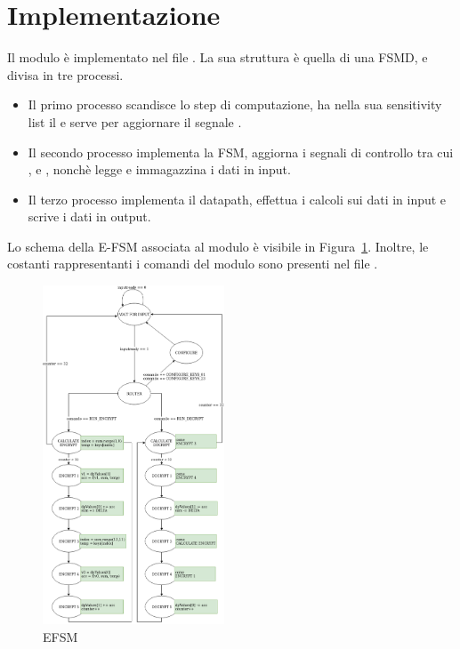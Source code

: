 \section{Implementazione}

Il modulo è implementato nel file . La sua struttura è quella di una FSMD, e divisa in tre processi.
\begin{itemize}
    \item Il primo processo scandisce lo step di computazione, ha nella sua sensitivity list il  e serve per aggiornare il segnale . 
    \item Il secondo processo implementa la FSM, aggiorna i segnali di controllo tra cui ,  e , nonchè legge e immagazzina i dati in input. 
    \item Il terzo processo implementa il datapath, effettua i calcoli sui dati in input e scrive i dati in output. 
\end{itemize} 
Lo schema della E-FSM associata al modulo è visibile in Figura~\ref{fig:efsm}. Inoltre, le costanti rappresentanti i comandi del modulo sono presenti nel file .

\begin{figure}
    \centering
    \includegraphics[width=0.48\textwidth]{vhdl_schemi/fsm.png}
    \caption{EFSM}
    \label{fig:efsm}
\end{figure}

